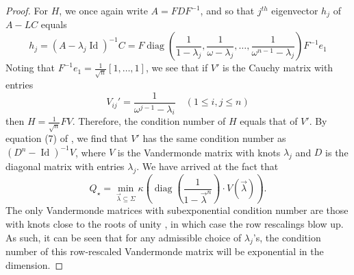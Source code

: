 \documentclass[11pt]{article}
\renewcommand{\subset}{\subseteq}
\numberwithin{equation}{section}
\begin{document}
\begin{proof}
For $H$, we once again write $A = FDF^{-1}$, and so that $j^{th}$ eigenvector $h_j$ of $A - LC$ equals
$$h_j = (A - \lambda_j \operatorname{Id})^{-1}C = F \operatorname{diag}\left(\frac{1}{1 - \lambda_j}, \frac{1}{\omega - \lambda_j}, \ldots, \frac{1}{\omega^{n-1} - \lambda_j}\right)F^{-1}e_1$$
Noting that $F^{-1}e_1 = \frac{1}{\sqrt{n}}[1, \ldots, 1]$, we see that if $V'$ is the Cauchy matrix with entries
$$V_{ij}' = \frac{1}{\omega^{j-1} - \lambda_i} \quad (1 \leq i,j\leq n)$$
then $H = \frac{1}{\sqrt{n}}FV$. Therefore, the condition number of $H$ equals that of $V'$. 
By equation (7) of 
\cite{cauchyvandermondematrices}, we find that $V'$ has the same condition number as $(D^n - \operatorname{Id})^{-1}V$, where $V$ is the Vandermonde matrix with knots $\lambda_j$ and $D$ is the diagonal matrix with entries $\lambda_j$. We have arrived at the fact that
$$Q_\star = \min_{\vec{\lambda} \subset \Sigma} \kappa\left(\operatorname{diag}\left(\frac{1}{1 - \vec{\lambda}^n}\right) \cdot V(\vec{\lambda})\right).$$
The only Vandermonde matrices with subexponential condition number are those with knots close to the roots of unity \cite{pan2015badvandermondematrices}, in which case the row rescalings blow up.
As such, it can be seen that for any admissible choice of $\lambda_j$'s, the condition number of this row-rescaled Vandermonde matrix will be exponential in the dimension.
\end{proof}



\end{document}
